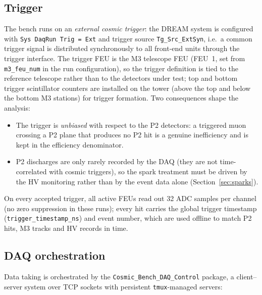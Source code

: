 \documentclass[11pt,a4paper]{article}
\newcommand{\code}[1]{\texttt{#1}}
\begin{document}
\subsection{Trigger}

The bench runs on an \emph{external cosmic trigger}: the DREAM system is
configured with \code{Sys DaqRun Trig = Ext} and trigger source
\code{Tg\_Src\_ExtSyn}, i.e.\ a common trigger signal is distributed
synchronously to all front-end units through the trigger interface. The
trigger FEU is the M3 telescope FEU (FEU~1, set from \code{m3\_feu\_num} in
the run configuration), so the trigger definition is tied to the reference
telescope rather than to the detectors under test; top and bottom trigger
scintillator counters are installed on the tower (above the top and below the
bottom M3 stations) for trigger formation. Two consequences shape the
analysis:

\begin{itemize}[itemsep=2pt]
  \item The trigger is \emph{unbiased} with respect to the P2 detectors: a
        triggered muon crossing a P2 plane that produces no P2 hit is a
        genuine inefficiency and is kept in the efficiency denominator.
  \item P2 discharges are only rarely recorded by the DAQ (they are not
        time-correlated with cosmic triggers), so the spark treatment must be
        driven by the HV monitoring rather than by the event data alone
        (Section~\ref{sec:sparks}).
\end{itemize}

On every accepted trigger, all active FEUs read out 32 ADC samples per channel
(no zero suppression in these runs); every hit carries the global trigger
timestamp (\code{trigger\_timestamp\_ns}) and event number, which are used
offline to match P2 hits, M3 tracks and HV records in time.

\subsection{DAQ orchestration}

Data taking is orchestrated by the \code{Cosmic\_Bench\_DAQ\_Control} package,
a client--server system over TCP sockets with persistent \code{tmux}-managed
servers:
\end{document}
